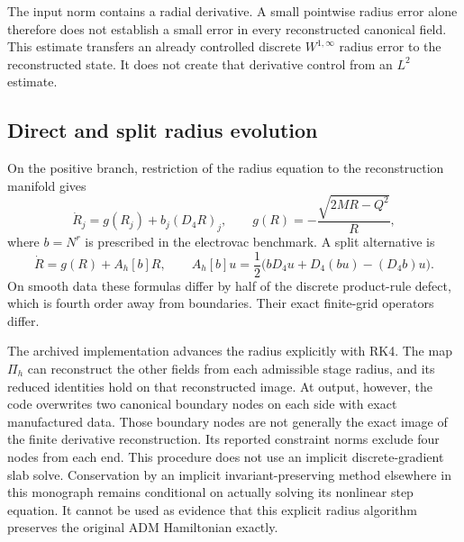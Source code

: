 The input norm contains a radial derivative. A small pointwise radius error alone therefore does not establish a small error in every reconstructed canonical field. This estimate transfers an already controlled discrete $W^{1,\infty}$ radius error to the reconstructed state. It does not create that derivative control from an $L^2$ estimate.

\subsection{Direct and split radius evolution}
On the positive branch, restriction of the radius equation to the reconstruction manifold gives
\begin{equation}
 \dot R_j=g(R_j)+b_j(D_4R)_j,
 \qquad g(R)=-\frac{\sqrt{2MR-Q^2}}R,
\label{c:strong:direct-radius}
\end{equation}
where $b=N^r$ is prescribed in the electrovac benchmark. A split alternative is
\begin{equation}
 \dot R=g(R)+A_h[b]R,\qquad
 A_h[b]u=\frac12\bigl(bD_4u+D_4(bu)-(D_4b)u\bigr).
\label{c:strong:split-radius}
\end{equation}
On smooth data these formulas differ by half of the discrete product-rule defect, which is fourth order away from boundaries. Their exact finite-grid operators differ.

The archived implementation advances the radius explicitly with RK4. The map $\Pi_h$ can reconstruct the other fields from each admissible stage radius, and its reduced identities hold on that reconstructed image. At output, however, the code overwrites two canonical boundary nodes on each side with exact manufactured data. Those boundary nodes are not generally the exact image of the finite derivative reconstruction. Its reported constraint norms exclude four nodes from each end. This procedure does not use an implicit discrete-gradient slab solve. Conservation by an implicit invariant-preserving method elsewhere in this monograph remains conditional on actually solving its nonlinear step equation. It cannot be used as evidence that this explicit radius algorithm preserves the original ADM Hamiltonian exactly.

